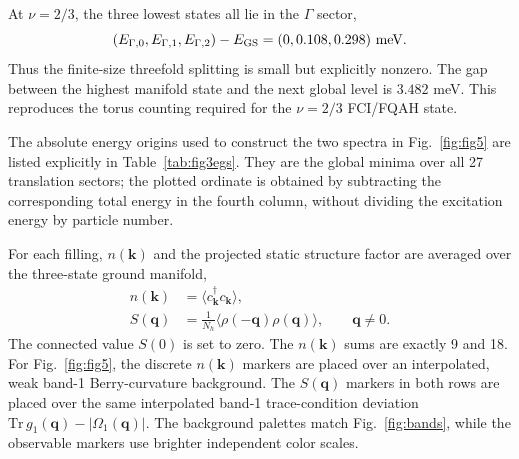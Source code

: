 \documentclass[10pt,twocolumn]{article}
\begin{document}
At $\nu=2/3$, the three lowest states all lie in the $\Gamma$ sector,
\begin{equation}
(E_{\Gamma,0},E_{\Gamma,1},E_{\Gamma,2})-E_{\rm GS}
=(0,0.108,0.298)\ \mathrm{meV}.
\end{equation}
Thus the finite-size threefold splitting is small but explicitly nonzero.  The gap between the highest manifold state and the next global level is $3.482$ meV.  This reproduces the torus counting required for the $\nu=2/3$ FCI/FQAH state.

The absolute energy origins used to construct the two spectra in
Fig.~\ref{fig:fig5} are listed explicitly in Table~\ref{tab:fig3egs}.
They are the global minima over all 27 translation sectors; the plotted
ordinate is obtained by subtracting the corresponding total energy in the
fourth column, without dividing the excitation energy by particle number.
\begin{table}[H]
\centering
\caption{Absolute one-band, 27-cell ground-state energies used as the
zero of the Fig.~\ref{fig:fig5} spectra.}
\label{tab:fig3egs}
\end{table}

For each filling, $n(\bm k)$ and the projected static structure factor are averaged over the three-state ground manifold,
\begin{align}
n(\bm k)&=\langle c^\dagger_{\bm k}c_{\bm k}\rangle,\\
S(\bm q)&=\frac{1}{N_h}\langle\rho(-\bm q)\rho(\bm q)\rangle,\qquad \bm q\ne0.
\end{align}
The connected value $S(0)$ is set to zero.  The $n(\bm k)$ sums are exactly 9 and 18.  For Fig.~\ref{fig:fig5}, the discrete $n(\bm k)$ markers are placed over an interpolated, weak band-1 Berry-curvature background.  The $S(\bm q)$ markers in both rows are placed over the same interpolated band-1 trace-condition deviation $\mathrm{Tr}\,g_1(\bm q)-|\Omega_1(\bm q)|$.  The background palettes match Fig.~\ref{fig:bands}, while the observable markers use brighter independent color scales.
\end{document}
